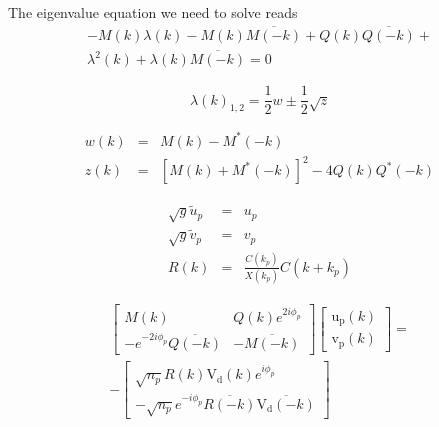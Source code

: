 \documentclass[a4paper,prb,10pt,aps,twocolumn]{revtex4-1}
\begin{document}
The eigenvalue equation we need to solve reads
\begin{multline}
  \label{eq:130}
- M{\left (k \right )} \lambda{\left (k \right )} - M{\left (k \right )} \overline{M{\left (- k \right )}} + Q{\left (k \right )} \overline{Q{\left (- k \right )}} +\\ \lambda^{2}{\left (k \right )} + \lambda{\left (k \right )} \overline{M{\left (- k \right )}} = 0
\end{multline}

\begin{equation}
  \label{eq:150}
\lambda\left(k\right)_{1,2}=\frac{1}{2}w\pm\frac{1}{2}\sqrt{z } 
\end{equation}

\begin{subequations}
  \begin{eqnarray}
    \label{eq:149}
w(k)&=&M\left(k\right)-M^{*}\left(-k\right)\\
z(k)&=&\left[M\left(k\right)+M^{*}\left(-k\right)\right]^{2}-4Q\left(k\right)Q^{*}\left(-k\right)
  \end{eqnarray}
\end{subequations}


\begin{subequations}
  \begin{eqnarray}
    \label{eq:132}
\sqrt{g}\tilde{u}_p &=& u_p\\
\sqrt{g}\tilde{v}_p &=& v_p\\
R(k) &=& \frac{C(k_p)}{X(k_p)}C(k+k_p) 
  \end{eqnarray}
\end{subequations}


\begin{multline}
  \label{eq:134}
\left[\begin{matrix}M{\left (k \right )} & Q{\left (k \right )} e^{2 i \phi_{p}}\\- e^{- 2 i \phi_{p}} \overline{Q{\left (- k \right )}} & - \overline{M{\left (- k \right )}}\end{matrix}\right]
\left[\begin{matrix}\operatorname{u_{p}}{\left (k \right )}\\\operatorname{v_{p}}{\left (k \right )}\end{matrix}\right]=\\
-\left[\begin{matrix}\sqrt{n_{p}} R{\left (k \right )} \operatorname{V_{d}}{\left (k \right )} e^{i \phi_{p}}\\- \sqrt{n_{p}} e^{- i \phi_{p}} \overline{R{\left (- k \right )}} \overline{\operatorname{V_{d}}{\left (- k \right )}}\end{matrix}\right]  
\end{multline}
\end{document}
